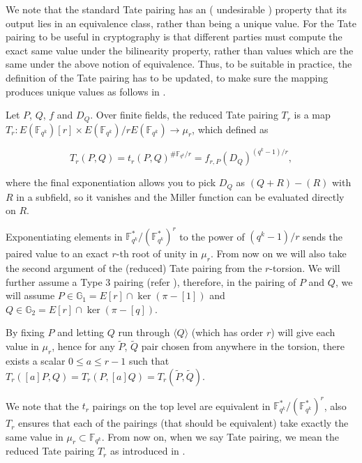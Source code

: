 
We note that the standard Tate pairing has an ( undesirable ) property that its output lies
in an equivalence class, rather than being a unique value.  For the Tate pairing to be useful in cryptography is that different parties must compute the exact same value under the bilinearity property, rather than values which are the same under the above notion of equivalence. Thus, to be suitable in practice, the definition of the Tate pairing has to be updated, to make sure the mapping produces unique values as follows in .

\begin{definition}
	Let $P$, $Q$, $f$ and $D_Q$. Over finite fields, the reduced Tate pairing $T_r$ is a map $T_r : E(\mathbb{F}_{q^k})[r] \times E(\mathbb{F}_{q^k})/rE(\mathbb{F}_{q^k}) \rightarrow \mu_r$, which defined as 
	
	\[
	T_r(P, Q) = t_r(P, Q)^{\#\mathbb{F}_{q^k}/r} = f_{r,P}(D_Q)^{(q^k - 1)/r},
	\]
	\label{def:reducedtatepairing}
\end{definition}
where the final exponentiation allows you to pick $D_Q$ as $(Q + R) - (R)$ with $R$ in a subfield, so it vanishes and the Miller function can be evaluated directly on $R$.

Exponentiating elements in $\mathbb{F}^*_{q^k}/(\mathbb{F}^*_{q^k})^r$ to the power of $(q^k - 1)/r$ sends the paired value to an exact $r$-th root of unity in $\mu_r$.  From now on we will also take the second argument of the (reduced) Tate pairing from the $r$-torsion. We will further assume a Type 3 pairing (refer ),  therefore, in the pairing of $P$ and $Q$, we will assume $P \in \mathbb{G}_1 = E[r] \cap \ker(\pi - [1])$ and $Q \in \mathbb{G}_2 = E[r] \cap \ker(\pi - [q])$. 

By fixing $P$ and letting $Q$ run through $\langle Q \rangle$ (which has order $r$) will give each value in $\mu_r$, hence for any $\tilde{P}$, $\tilde{Q}$ pair chosen from anywhere in the torsion, there exists a scalar $0 \leq a \leq r - 1$ such that $T_r([a]P, Q) = T_r(P, [a]Q) = T_r(\tilde{P}, \tilde{Q})$.

We note that the $t_r$ pairings on the top level are equivalent in $\mathbb{F}^*_{q^k}/(\mathbb{F}^*_{q^k})^r$, also $T_r$ ensures that each of the pairings (that should be equivalent) take exactly the same value in $\mu_r \subset \mathbb{F}_{q^k}$. From now on, when we say Tate pairing, we mean the reduced Tate pairing $T_r$ as introduced in .


